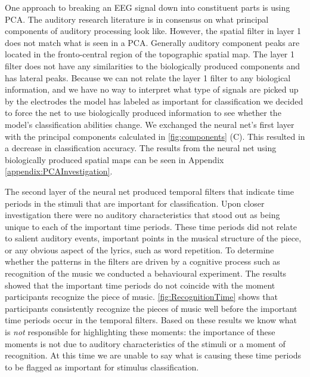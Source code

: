One approach to breaking an EEG signal down into constituent parts is using \ac{PCA}.
The auditory research literature is in consensus on what principal components of auditory processing look like.
However, the spatial filter in layer 1 does not match what is seen in a \ac{PCA}. 
Generally auditory component peaks are located in the fronto-central region of the topographic spatial map. 
The layer 1 filter does not have any similarities to the biologically produced components and has lateral peaks. 
Because we can not relate the layer 1 filter to any biological information, and we have no way to interpret what type of signals are picked up by the electrodes the model has labeled as important for classification we decided to force the net to use biologically produced information to see whether the model's classification abilities change. 
We exchanged the neural net's first layer with the principal components calculated in \autoref{fig:components} (C). 
This resulted in a decrease in classification accuracy. The results from the neural net using biologically produced spatial maps can be seen in Appendix \ref{appendix:PCAInvestigation}.

The second layer of the neural net produced temporal filters that indicate time periods in the stimuli that are important for classification. 
Upon closer investigation there were no auditory characteristics that stood out as being unique to each of the important time periods.
These time periods did not relate to salient auditory events, important points in the musical structure of the piece, or any obvious aspect of the lyrics, such as word repetition. 
To determine whether the patterns in the filters are driven by a cognitive process such as recognition of the music we conducted a behavioural experiment.
The results showed that the important time periods do not coincide with the moment participants recognize the piece of music. 
\autoref{fig:RecognitionTime} shows that participants consistently recognize the pieces of music well before the important time periods occur in the temporal filters. 
Based on these results we know what is \emph{not} responsible for highlighting these moments: the importance of these moments is not due to auditory characteristics of the stimuli or a moment of recognition.
At this time we are unable to say what is causing these time periods to be flagged as important for stimulus classification. 

